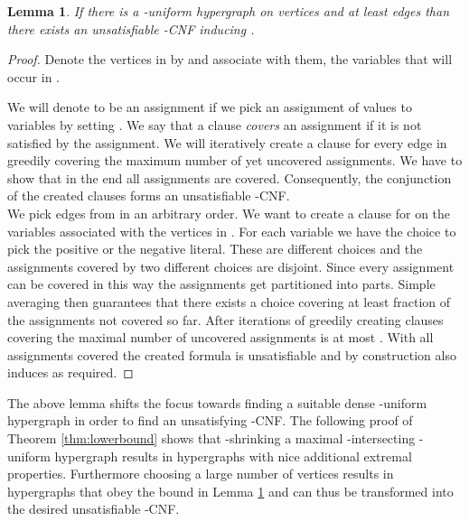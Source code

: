 \documentclass[11pt,letterpaper]{article}
\newtheorem{theorem}{Theorem}
\newtheorem{lemma}[theorem]{Lemma}
\begin{document}
\begin{lemma}\label{lemma:construction-unsat}
If there is a -uniform hypergraph  on  vertices and at least  edges than there exists an unsatisfiable -CNF  inducing . 
\end{lemma}
\begin{proof}
Denote the vertices in  by  and associate with them, the variables  that will occur in .

We will denote  to be an assignment if we pick an assignment of values to variables  by setting .
We say that a clause \emph{covers} an assignment  if it is not satisfied by the assignment. We will iteratively create a clause for every edge in  greedily covering the maximum number of yet uncovered assignments. We have to show that in the end all  assignments are covered. Consequently, the conjunction of the created clauses forms an unsatisfiable -CNF.\\

We pick edges  from  in an arbitrary order. We want to create a clause for  on the  variables associated with the  vertices in . For each variable we have the choice to pick the positive or the negative literal. These are  different choices and the assignments covered by two different choices are disjoint. Since every assignment can be covered in this way the assignments get partitioned into  parts. Simple averaging then guarantees that there exists a choice covering at least  fraction of the assignments not covered so far. After  iterations of greedily creating clauses covering the maximal number of uncovered assignments is at most . With all assignments covered the created formula  is unsatisfiable and by construction also induces  as required.
\end{proof}

\medskip

The above lemma shifts the focus towards finding a suitable dense -uniform hypergraph in order to find an unsatisfying -CNF. The following proof of Theorem \ref{thm:lowerbound} shows that -shrinking a maximal -intersecting -uniform hypergraph results in hypergraphs with nice additional extremal properties. Furthermore choosing a large number of vertices results in hypergraphs that obey the bound in Lemma \ref{lemma:construction-unsat} and can thus be transformed into the desired unsatisfiable -CNF.

\iffalse
\begin{theorem}\label{thm:upperbound}
For any  and  there is an unsatisfiable -intersecting -CNF with at most

clause intersections 

variables

clauses and a maximum degree of
.
\end{theorem}
\fi
\end{document}
